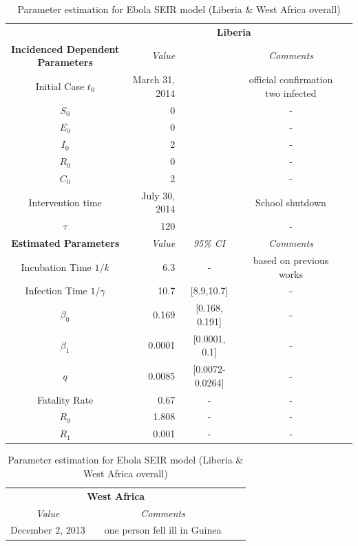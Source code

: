 \documentclass[10pt, journal,onecolumn]{IEEEtran}
\newcommand{\ra}[1]{\renewcommand{\arraystretch}{#1}}
\begin{document}
\begin{appendix}
\begin{table}[h]
\label{Table:parameter2}
\caption{Parameter estimation for Ebola SEIR model (Liberia \& West Africa overall)} 
\centering
\tiny
\parbox{.55\linewidth}{\centering
\ra{1.3}
\begin{tabular}{@{}crccc@{}}%
& \multicolumn{3}{c}{\textbf{Liberia}} &  \\
\cmidrule{2-4}
\textbf{Incidenced Dependent Parameters} & \textit{Value} && \textit{Comments} \\
\midrule
Initial Case $t_0$ & March 31, 2014 &  & official confirmation two infected \cite{}\\
$S_0$ & 0& & -\\
$E_0$ & 0& & -\\
$I_0$ & 2& & -\\
$R_0$ & 0& & -\\
$C_0$ & 2& &-\\
Intervention time & July 30, 2014 &  & School shutdown\\
$\tau$ &120 & & -\\
\midrule
\textbf{Estimated Parameters} & \textit{Value} & \textit{95\% CI} & \textit{Comments} \\
\midrule
Incubation Time $1/k$ &6.3 & - & based on previous works \cite{}\\
Infection Time $1/\gamma$ &10.7 & [8.9,10.7] & -\\
$\beta_0$ &0.169 & [0.168, 0.191] & -\\
$\beta_1$ &0.0001 & [0.0001, 0.1] & -\\
$q$ &0.0085 & [0.0072-0.0264] & -\\
Fatality Rate &0.67 & - & -\\
$R_0$ &1.808 &- &-\\
$R_1$ &0.001 & - &-\\
\end{tabular}
}
\parbox{.3\linewidth}{\centering
\ra{1.3}
\begin{tabular}{@{}crccc@{}}%
\multicolumn{3}{c}{\textbf{West Africa}} &  \\
\cmidrule{1-3}
 \textit{Value} && \textit{Comments} \\
\midrule
December 2, 2013 &  & one person fell ill in Guinea\\

\end{tabular}}
\end{table}
\end{appendix}
\end{document}
